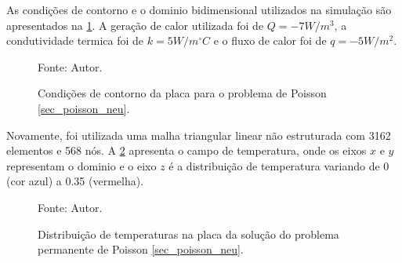 As condições de contorno e o dominio bidimensional utilizados na simulação são apresentados na \ref{poisson_n_bc}.
A geração de calor utilizada foi de $Q = -7W/m^3$, a condutividade termica foi de $k=5 W/m^{\circ}C$ e o fluxo de calor foi de $q = -5 W/m^2$.
\begin{figure}[H]
    \centering
     {\raggedleft \scriptsize Fonte: Autor.}
    \caption{Condições de contorno da placa para o problema de Poisson \ref{sec_poisson_neu}.}
    \label{poisson_n_bc}
\end{figure}

Novamente, foi utilizada uma malha triangular linear não estruturada com 3162 elementos e 568 nós.
A \ref{poisson_n_3d} apresenta o campo de temperatura, onde os eixos $x$ e $y$ representam o dominio e o eixo $z$ é a distribuição de temperatura variando de 0 (cor azul) a 0.35 (vermelha).
\begin{figure}[H]
    \centering
     {\raggedleft \scriptsize Fonte: Autor.}
    \caption{Distribuição de temperaturas na placa da solução do problema permanente de Poisson \ref{sec_poisson_neu}.}
    \label{poisson_n_3d}
\end{figure}

